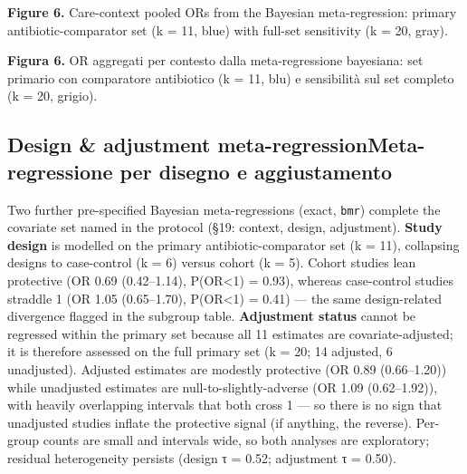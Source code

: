 \documentclass[
  letterpaper,
  DIV=11,
  numbers=noendperiod]{scrartcl}
\begin{document}
\textbf{Figure 6.} Care-context pooled ORs from the Bayesian
meta-regression: primary antibiotic-comparator set (k = 11, blue) with
full-set sensitivity (k = 20, gray).

\textbf{Figura 6.} OR aggregati per contesto dalla meta-regressione
bayesiana: set primario con comparatore antibiotico (k = 11, blu) e
sensibilità sul set completo (k = 20, grigio).

\subsection{\texorpdfstring{{Design \& adjustment
meta-regression}{Meta-regressione per disegno e
aggiustamento}}{Design \& adjustment meta-regressionMeta-regressione per disegno e aggiustamento}}\label{design-adjustment-meta-regressionmeta-regressione-per-disegno-e-aggiustamento}

Two further pre-specified Bayesian meta-regressions (exact,
\texttt{bmr}) complete the covariate set named in the protocol (§19:
context, design, adjustment). \textbf{Study design} is modelled on the
primary antibiotic-comparator set (k = 11), collapsing designs to
case-control (k = 6) versus cohort (k = 5). Cohort studies lean
protective (OR 0.69 (0.42--1.14), P(OR\textless1) = 0.93), whereas
case-control studies straddle 1 (OR 1.05 (0.65--1.70), P(OR\textless1) =
0.41) --- the same design-related divergence flagged in the subgroup
table. \textbf{Adjustment status} cannot be regressed within the primary
set because all 11 estimates are covariate-adjusted; it is therefore
assessed on the full primary set (k = 20; 14 adjusted, 6 unadjusted).
Adjusted estimates are modestly protective (OR 0.89 (0.66--1.20)) while
unadjusted estimates are null-to-slightly-adverse (OR 1.09
(0.62--1.92)), with heavily overlapping intervals that both cross 1 ---
so there is no sign that unadjusted studies inflate the protective
signal (if anything, the reverse). Per-group counts are small and
intervals wide, so both analyses are exploratory; residual heterogeneity
persists (design τ = 0.52; adjustment τ = 0.50).
\end{document}
